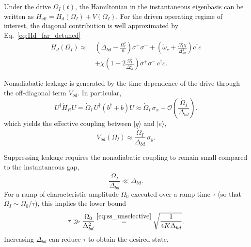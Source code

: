 Under the drive $\Omega_I(t)$, the Hamiltonian in the instantaneous eigenbasis can be written as
$H_{\mathrm{eff}} = H_d(\Omega_I) + V(\Omega_I)$.
For the driven operating regime of interest, the diagonal contribution is well approximated by Eq.\ \eqref{eq:Hd_far_detuned}
\begin{equation}
\begin{aligned}
H_d(\Omega_I) \approx\;&
\left( \Delta_{bd} - \frac{\Omega_I^2}{\kappa} \right) \sigma^+ \sigma^-
+ \left( \tilde{\omega}_c + \frac{\Omega_I^2 \chi}{\Delta_{bd}^2} \right) c^\dagger c \\
&+ \chi \left( 1 - 2 \frac{\Omega_I^2}{\Delta_{bd}^2} \right) \sigma^+ \sigma^-\, c^\dagger c .
\end{aligned}
\end{equation}

Nonadiabatic leakage is generated by the time dependence of the drive through the off-diagonal term $V_{od}$.
In particular,
\begin{equation}
U^\dagger \dot{H}_R U
= \dot{\Omega}_I\, U^\dagger (b^\dagger + b) U
\approx \dot{\Omega}_I\, \sigma_x
+ \mathcal{O}\!\left(\frac{\dot{\Omega}_I}{\Delta_{bd}}\right).
\end{equation}
which yields the effective coupling between $|g\rangle$ and $|e\rangle$,
\begin{equation}
V_{od}(\Omega_I) \approx \frac{\dot{\Omega}_I}{\Delta_{bd}}\, \sigma_y .
\end{equation}

Suppressing leakage requires the nonadiabatic coupling to remain small compared to the instantaneous gap,
\begin{equation}
\frac{\dot{\Omega}_I}{\Delta_{bd}} \ll \Delta_{bd}.
\end{equation}
For a ramp of characteristic amplitude $\Omega_0$ executed over a ramp time $\tau$ (so that $\dot{\Omega}_I \sim \Omega_0/\tau$), this implies the lower bound
\begin{equation}
\tau \gg \frac{\Omega_0}{\Delta_{bd}^2}\overset{\eqref{eq:ss_unselective}}{=}\sqrt{\frac{1}{4K\Delta_{bd}}}.
\end{equation}
Increasing $\Delta_{bd}$ can reduce $\tau$ to obtain the desired state.

